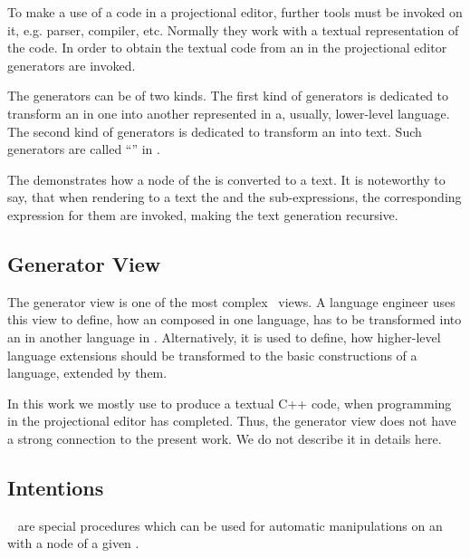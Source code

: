 To make a use of a code in a projectional editor, further tools must be invoked on it, e.g. parser, compiler, etc.
Normally they work with a textual representation of the code. In order to obtain the textual code from an  in the projectional
editor generators are invoked. 

The generators can be of two kinds. The first kind of generators is dedicated to transform an  in one  into
another  represented in a, usually, lower-level language. The second kind of generators is dedicated to transform an  into text.
Such generators are called ``'' in \jbmps.


The  demonstrates how a node of the   is converted to a text. It is noteworthy 
to say, that when rendering to a text the  and the  sub-expressions, the corresponding expression 
for them are invoked, making the text generation recursive.


\subsection{Generator View}
\label{generators}
The generator view is one of the most complex \jbmps\ views. A language engineer uses this view to define, how an  composed
in one language, has to be transformed into an  in another language in \jbmps. Alternatively, it is used to define, how higher-level
language extensions should be transformed to the basic constructions of a language, extended by them.

In this work we mostly use  to produce a textual C++ code, when programming in the projectional editor has completed.
Thus, the generator view does not have a strong connection to the present work. We do not describe it in details here.

\subsection{Intentions}
\label{intentions}

\jbmps\  are special procedures which can be used for automatic manipulations on an  with a node of a given .


